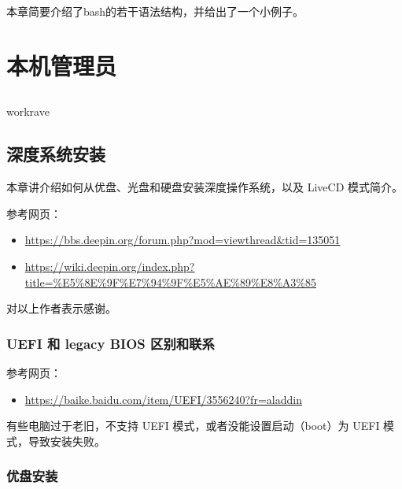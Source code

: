 \documentclass[doctor,openright,twoside]{sjtuthesis}
\newif\ifusepartquote
\newcommand{\thepartquote}{}
\newcommand{\thepartquoteauthor}{}
\newcommand{\partquote}[2]{\ifusepartquote\renewcommand{\thepartquote}{#1}\renewcommand{\thepartquoteauthor}{#2}\fi}
\newif\ifusepartintro
\newcommand{\thepartintro}{}
\newcommand{\partintro}[1]{\ifusepartintro\renewcommand{\thepartintro}{#1}\fi}
\providecommand{\tightlist}{%
    \setlength{\itemsep}{0pt}\setlength{\parskip}{0pt}}
\theoremstyle{plain}
\theoremstyle{definition}
\theoremstyle{remark}
\theoremstyle{ocrenumbox}
\theoremstyle{plain}
\begin{document}
本章简要介绍了bash的若干语法结构，并给出了一个小例子。

\partquote{一屋不扫，何以扫天下}{出处《习惯说》}
\partintro{
本部分介绍软件安装、用户管理、磁盘管理等基础知识，为后续工作打牢基础。
}

\hypertarget{part:local-admin}{%
\part{本机管理员}\label{part:local-admin}}

\hypertarget{section}{%
\chapter{}\label{section}}

workrave

\hypertarget{deepin-install}{%
\chapter{深度系统安装}\label{deepin-install}}

本章讲介绍如何从优盘、光盘和硬盘安装深度操作系统，以及 LiveCD 模式简介。

参考网页：

\begin{itemize}
\tightlist
\item
  \url{https://bbs.deepin.org/forum.php?mod=viewthread\&tid=135051}
\item
  \url{https://wiki.deepin.org/index.php?title=\%E5\%8E\%9F\%E7\%94\%9F\%E5\%AE\%89\%E8\%A3\%85}
\end{itemize}

对以上作者表示感谢。

\hypertarget{uefi--legacy-bios-}{%
\section{UEFI 和 legacy BIOS 区别和联系}\label{uefi--legacy-bios-}}

参考网页：

\begin{itemize}
\tightlist
\item
  \url{https://baike.baidu.com/item/UEFI/3556240?fr=aladdin}
\end{itemize}

有些电脑过于老旧，不支持 UEFI 模式，或者没能设置启动（boot）为 UEFI
模式，导致安装失败。

\section{优盘安装}
\end{document}
